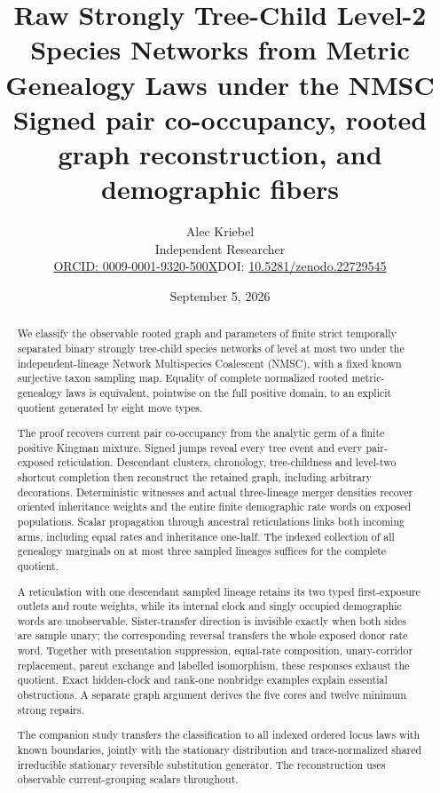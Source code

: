 \documentclass[11pt]{article}
\title{\textbf{Raw Strongly Tree-Child Level-2 Species Networks from Metric Genealogy Laws under the NMSC}\\[3pt]
Signed pair co-occupancy, rooted graph reconstruction, and demographic fibers}
\author{Alec Kriebel\\Independent Researcher\\\small\href{https://orcid.org/0009-0001-9320-500X}{ORCID: 0009-0001-9320-500X}\quad DOI: \href{https://doi.org/10.5281/zenodo.22729545}{10.5281/zenodo.22729545}}
\date{September 5, 2026}
\begin{document}
\maketitle

\begin{abstract}
We classify the observable rooted graph and parameters of finite strict temporally separated binary strongly tree-child species networks of level at most two under the independent-lineage Network Multispecies Coalescent (NMSC), with a fixed known surjective taxon sampling map. Equality of complete normalized rooted metric-genealogy laws is equivalent, pointwise on the full positive domain, to an explicit quotient generated by eight move types.

The proof recovers current pair co-occupancy from the analytic germ of a finite positive Kingman mixture. Signed jumps reveal every tree event and every pair-exposed reticulation. Descendant clusters, chronology, tree-childness and level-two shortcut completion then reconstruct the retained graph, including arbitrary decorations. Deterministic witnesses and actual three-lineage merger densities recover oriented inheritance weights and the entire finite demographic rate words on exposed populations. Scalar propagation through ancestral reticulations links both incoming arms, including equal rates and inheritance one-half. The indexed collection of all genealogy marginals on at most three sampled lineages suffices for the complete quotient.

A reticulation with one descendant sampled lineage retains its two typed first-exposure outlets and route weights, while its internal clock and singly occupied demographic words are unobservable. Sister-transfer direction is invisible exactly when both sides are sample unary; the corresponding reversal transfers the whole exposed donor rate word. Together with presentation suppression, equal-rate composition, unary-corridor replacement, parent exchange and labelled isomorphism, these responses exhaust the quotient. Exact hidden-clock and rank-one nonbridge examples explain essential obstructions. A separate graph argument derives the five cores and twelve minimum strong repairs.

The companion study transfers the classification to all indexed ordered locus laws with known boundaries, jointly with the stationary distribution and trace-normalized shared irreducible stationary reversible substitution generator. The reconstruction uses observable current-grouping scalars throughout.
\end{abstract}
\end{document}
